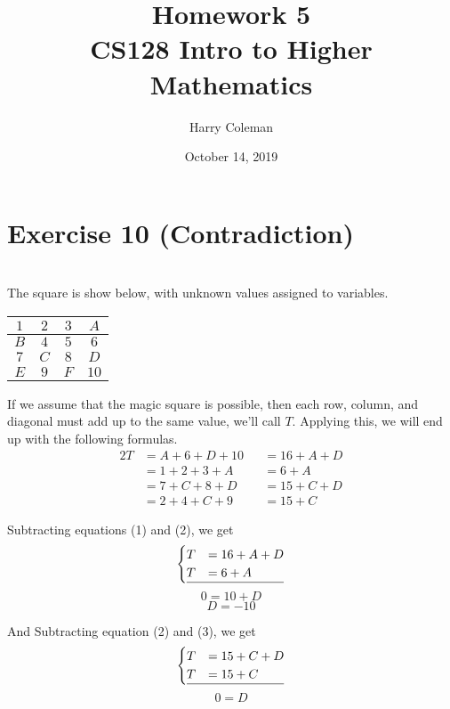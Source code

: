 \documentclass[11pt]{article}
\begin{document}
 
\title{Homework 5\\
    \large CS128 Intro to Higher Mathematics}
\author{Harry Coleman}
\date{October 14, 2019}

\maketitle

\section*{Exercise 10 (Contradiction)}
\\

The square is show below, with unknown values assigned to variables.
\begin{center}
    \begin{tabular}{|c|c|c|c|}
        \hline
        $1$ & $2$ & $3$ & $A$ \\
        \hline
        $B$ & $4$ & $5$ & $6$ \\
        \hline
        $7$ & $C$ & $8$ & $D$ \\
        \hline
        $E$ & $9$ & $F$ & $10$ \\
        \hline
    \end{tabular}
\end{center}

If we assume that the magic square is possible, then each row, column, and diagonal must add up to the same value, we'll call $T$. Applying this, we will end up with the following formulas.
\begin{alignat}{2}
    T &= A + 6 + D + 10 &&= 16 + A + D \\
    &= 1 + 2 + 3 + A &&= 6 + A \\
    &= 7 + C + 8 + D &&= 15 + C + D \\
    &= 2 + 4 + C + 9 &&= 15 + C
\end{alignat}

Subtracting equations (1) and (2), we get
\[\begin{cases}
    T &= 16 + A + D \\
    T &= 6 + A \\
    \hline
\end{cases}\]
\[0 = 10 + D\]
\[D = -10\]

And Subtracting equation (2) and (3), we get
\[\begin{cases}
    T &= 15 + C + D \\
    T &= 15 + C \\
    \hline
\end{cases}\]
\[0 = D\]
\end{document}
